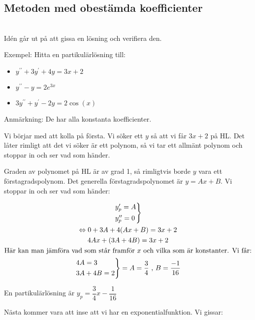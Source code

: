 \subsection{Metoden med obestämda koefficienter}\hfill\\

\noindent Idén går ut på att gissa en lösning och verifiera den.
\par\bigskip
\noindent Exempel: Hitta en partikulärlösning till:
\par\bigskip

\begin{itemize}
  \item $y^{\prime\prime}+3y^{\prime}+4y=3x+2$\\
  \item $y^{\prime\prime}-y = 2e^{3x}$\\
  \item $3y^{\prime\prime}+y^{\prime}-2y=2\cos(x)$\\
\end{itemize}
\par\bigskip
\noindent Anmärkning: De har alla konstanta koefficienter.
\par\bigskip
\noindent Vi börjar med att kolla på första. Vi söker ett $y$ så att vi får $3x+2$ på HL. Det låter rimligt att det vi söker är ett polynom, så vi tar ett allmänt polynom och stoppar in och ser vad som händer.
\par\bigskip
\noindent Graden av polynomet på HL är av grad 1, så rimligtvis borde $y$ vara ett förstagradspolynom. Det generella förstagradspolynomet är $y = Ax+B$. Vi stoppar in och ser vad som händer:


\begin{equation*}
  \begin{gathered}
    \begin{rcases*}
      y_p^{\prime}=A\\
      y_p^{\prime\prime}=0
    \end{rcases*}\\
    \Lrarr 0+3A+4(Ax+B)=3x+2\\
    4Ax+(3A+4B) = 3x+2\\
    \text{Här kan man jämföra vad som står framför $x$ och vilka som är konstanter. Vi får:}\\
    \begin{rcases*}
      4A = 3\\
      3A+4B = 2
    \end{rcases*}= A=\dfrac{3}{4}\text{ , } B=\dfrac{-1}{16}
  \end{gathered}
\end{equation*}
\par\bigskip
\noindent En partikulärlösning är $y_p = \dfrac{3}{4}x-\dfrac{1}{16}$
\par\bigskip
\noindent Nästa kommer vara att inse att vi har en exponentialfunktion. Vi gissar:


